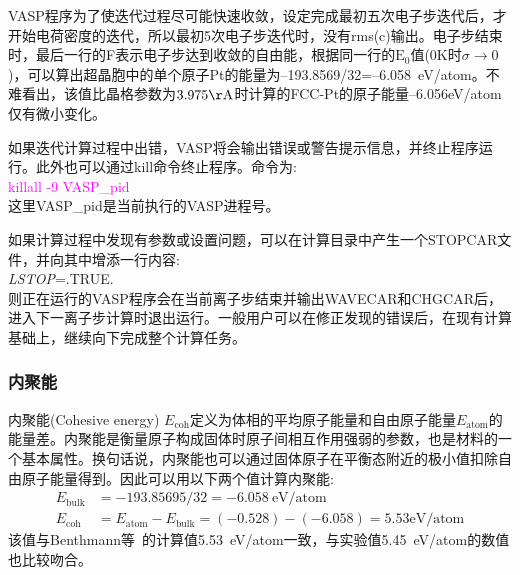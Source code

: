 {{\textrm{VASP}程序为了使迭代过程尽可能快速收敛，设定完成最初五次电子步迭代后，才开始电荷密度的迭代，所以最初5次电子步迭代时，没有\textrm{rms(c)}输出。电子步结束时，最后一行的\textrm{F}表示电子步达到收敛的自由能，根据同一行的$\mathrm{E}_0$值(0\textrm{K}时$\sigma\rightarrow0$)，可以算出超晶胞中的单个原子\textrm{Pt}的能量为--193.8569/32=--6.058\textrm{~eV/atom}。不难看出，该值比晶格参数为$3.975\mathrm{\AA}$时计算的\textrm{FCC-Pt}的原子能量--6.056\textrm{eV/atom}仅有微小变化。

如果迭代计算过程中出错，\textrm{VASP}将会输出错误或警告提示信息，并终止程序运行。此外也可以通过\textrm{kill}命令终止程序。命令为:~\\
\textcolor{magenta}{\textrm{killall -9 VASP\_pid}}\\
这里\textrm{VASP\_pid}是当前执行的\textrm{VASP}进程号。

如果计算过程中发现有参数或设置问题，可以在计算目录中产生一个\textrm{STOPCAR}文件，并向其中增添一行内容:~\\
\textit{LSTOP}=\textrm{.TRUE.}\\
则正在运行的\textrm{VASP}程序会在当前离子步结束并输出\textrm{WAVECAR}和\textrm{CHGCAR}后，进入下一离子步计算时退出运行。一般用户可以在修正发现的错误后，在现有计算基础上，继续向下完成整个计算任务。

\subsubsection{内聚能}
内聚能\textrm{(Cohesive energy) $E_{\mathrm{coh}}$}定义为体相的平均原子能量和自由原子能量$E_{\mathrm{atom}}$的能量差。内聚能是衡量原子构成固体时原子间相互作用强弱的参数，也是材料的一个基本属性。换句话说，内聚能也可以通过固体原子在平衡态附近的极小值扣除自由原子能量得到。因此可以用以下两个值计算内聚能:~
\begin{displaymath}
	\begin{aligned}
		E_{\mathrm{bulk}}&=-193.85695/32=-6.058~\mathrm{eV/atom}\\
		E_{\mathrm{coh}}&=E_{\mathrm{atom}}-E_{\mathrm{bulk}}=(-0.528)-(-6.058)=5.53\mathrm{eV/atom}
	\end{aligned}
\end{displaymath}
该值与\textrm{Benthmann等}~的计算值5.53\textrm{~eV/atom}\cite{PRB78-205302_2008}一致，与实验值5.45\textrm{~eV/atom}\cite{Landolt-Bornstein}的数值也比较吻合。
}}
